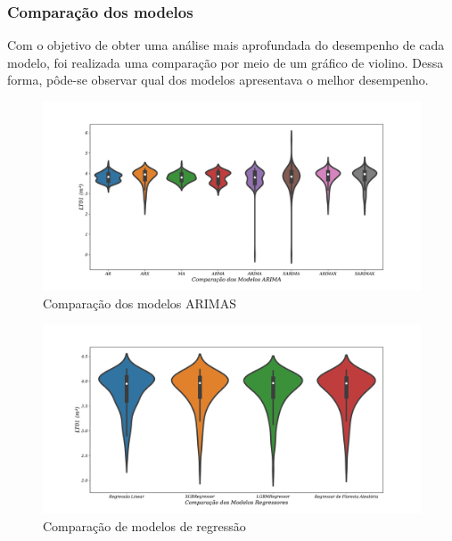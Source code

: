 \subsubsection{Compara\c c\~ao dos modelos}

Com o objetivo de obter uma análise mais aprofundada do desempenho de cada modelo, foi realizada uma comparação por meio de um gráfico de violino. Dessa forma, pôde-se observar qual dos modelos apresentava o melhor desempenho.


\begin{figure}[H]
	\centering
	\caption{Comparação dos modelos ARIMAS}
	\includegraphics[width=0.9\linewidth]{Resultados/Figuras/modelos-arima}
	
	\label{fig:modelos-arima}
	
\end{figure}


\begin{figure}[H]
	\centering
	\caption{Comparação de modelos de regressão }
	\includegraphics[width=0.9\linewidth]{Resultados/Figuras/violin-LR-XGB-LGBM-RF}
	
	\label{fig:violin-lr-xgb-lgbm-rf}
	
\end{figure}

